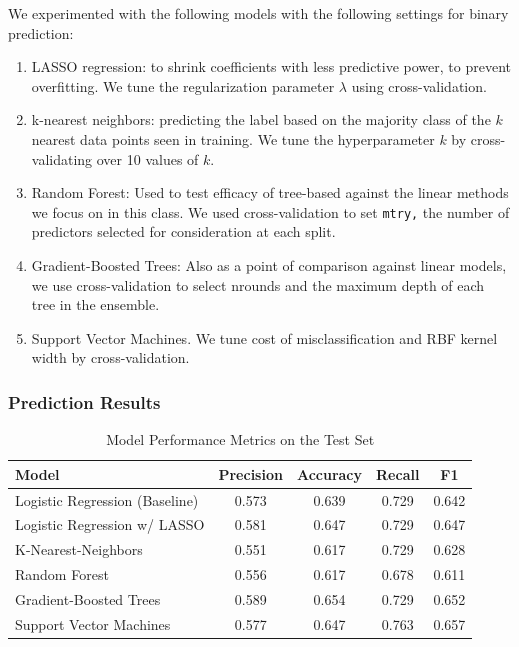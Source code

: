 \documentclass{article}
\begin{document}
We experimented with the following models with the following settings for binary prediction:
\begin{enumerate}
    \item LASSO regression: to shrink coefficients with less predictive power, to prevent overfitting. We tune the regularization parameter $\lambda$ using cross-validation.
    \item k-nearest neighbors: predicting the label based on the majority class of the $k$ nearest data points seen in training. We tune the hyperparameter $k$ by cross-validating over 10 values of $k.$
    \item Random Forest: Used to test efficacy of tree-based against the linear methods we focus on in this class. We used cross-validation to set \texttt{mtry,} the number of predictors selected for consideration at each split.
    \item Gradient-Boosted Trees: Also as a point of comparison against linear models, we use cross-validation to select nrounds and the maximum depth of each tree in the ensemble.
    \item Support Vector Machines. We tune cost of misclassification and RBF kernel width by cross-validation.
\end{enumerate}

\subsubsection{\hspace{0.5em} Prediction Results}

\begin{table}[h!]
\centering
\caption{Model Performance Metrics on the Test Set}
\begin{tabular}{lcccc}
\hline
\textbf{Model} & \textbf{Precision} & \textbf{Accuracy} & \textbf{Recall} & \textbf{F1} \\
\hline
Logistic Regression (Baseline)   & 0.573 & 0.639 & 0.729 & 0.642 \\
Logistic Regression w/ LASSO     & 0.581 & 0.647 & 0.729 & 0.647 \\
K-Nearest-Neighbors              & 0.551 & 0.617 & 0.729 & 0.628 \\
Random Forest                    & 0.556 & 0.617 & 0.678 & 0.611 \\
Gradient-Boosted Trees           & 0.589 & 0.654 & 0.729 & 0.652 \\
Support Vector Machines          & 0.577 & 0.647 & 0.763 & 0.657 \\
\hline
\end{tabular}
\label{tab:model_performance}
\end{table}
\end{document}

